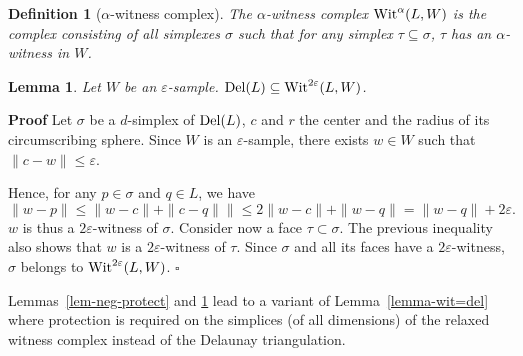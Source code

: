\documentclass[11pt,a4paper]{article}
\newtheorem{definition}{Definition}
\newtheorem{lemma}{Lemma}
\newenvironment{proof}
        {\noindent \textbf{Proof} \hspace{0.3mm}}
        {\hspace{0.3mm}$\square$  \smallskip}
\newcommand{\e}{\varepsilon}
\newcommand{\del}{{\rm Del}}
\newcommand{\wit}{{\rm Wit}}
\begin{document}



\begin{definition}[$\alpha$-witness complex]
  The $\alpha$-witness complex $\wit^{\alpha}  (L,W)$ is the complex consisting of all
  simplexes $\sigma$ such that for any simplex $\tau\subseteq
  \sigma$, $\tau$ has an $\alpha$-witness in $W$.
\end{definition}

\begin{lemma}
\label{lem-relaxed-wit}
Let $W$ be an $\e$-sample. $\del (L) \subseteq \wit^{2\e} (L,W)$.
\end{lemma}

\begin{proof}
Let $\sigma$ be a $d$-simplex of $\del (L)$, $c$ and $r$ the center
and the radius of its circumscribing sphere. Since $W$ is an
$\e$-sample, there exists $w\in W$ such that $\| c-w\| \leq \e$.

Hence,  for any $p\in \sigma$ and $q\in L$, we have
\[ \| w-p\|
  \leq \| w-c\| + \| c-q\| \| \leq 2  \| w-c\| + \| w-q\| = \|w-q\| +
  2\e.\]
$w$ is thus a $2\e$-witness of $\sigma$.
Consider now a face $\tau\subset \sigma$.  The previous inequality
also shows that  $w$ is a $2\e$-witness of $\tau$. Since
$\sigma$ and all its faces have a $2\e$-witness, $\sigma$
belongs to $\wit^{2\e}(L,W)$.
\end{proof}

Lemmas~\ref{lem-neg-protect} and \ref{lem-relaxed-wit} lead to a variant of  Lemma~\ref{lemma-wit=del} where protection
is required on the simplices (of all dimensions) of the relaxed witness complex instead of the Delaunay
triangulation. 
\end{document}
